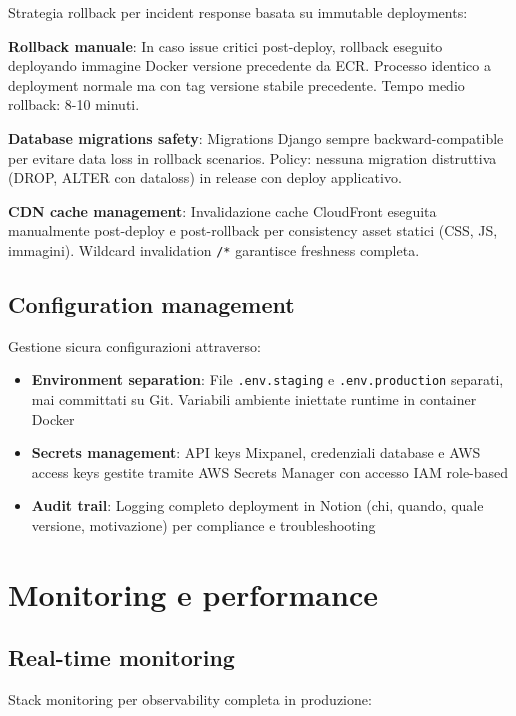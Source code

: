 Strategia rollback per incident response basata su immutable deployments:

\textbf{Rollback manuale}: In caso issue critici post-deploy, rollback eseguito deployando immagine Docker versione precedente da ECR. Processo identico a deployment normale ma con tag versione stabile precedente. Tempo medio rollback: 8-10 minuti.

\textbf{Database migrations safety}: Migrations Django sempre backward-compatible per evitare data loss in rollback scenarios. Policy: nessuna migration distruttiva (DROP, ALTER con dataloss) in release con deploy applicativo.

\textbf{CDN cache management}: Invalidazione cache CloudFront eseguita manualmente post-deploy e post-rollback per consistency asset statici (CSS, JS, immagini). Wildcard invalidation \texttt{/*} garantisce freshness completa.

\subsection{Configuration management}

Gestione sicura configurazioni attraverso:

\begin{itemize}
  \item \textbf{Environment separation}: File \texttt{.env.staging} e \texttt{.env.production} separati, mai committati su Git. Variabili ambiente iniettate runtime in container Docker
  \item \textbf{Secrets management}: API keys Mixpanel, credenziali database e AWS access keys gestite tramite AWS Secrets Manager con accesso IAM role-based
  \item \textbf{Audit trail}: Logging completo deployment in Notion (chi, quando, quale versione, motivazione) per compliance e troubleshooting
\end{itemize}

\section{Monitoring e performance}

\subsection{Real-time monitoring}

Stack monitoring per observability completa in produzione:

